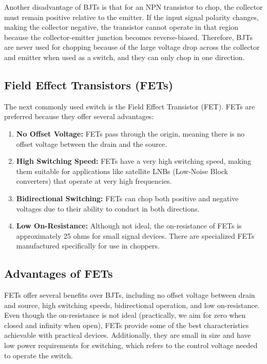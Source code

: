 Another disadvantage of BJTs is that for an NPN transistor to chop, the collector must remain positive relative to the emitter. If the input signal polarity changes, making the collector negative, the transistor cannot operate in that region because the collector-emitter junction becomes reverse-biased. Therefore, BJTs are never used for chopping because of the large voltage drop across the collector and emitter when used as a switch, and they can only chop in one direction.

\subsection{Field Effect Transistors (FETs)}
The next commonly used switch is the Field Effect Transistor (FET). FETs are preferred because they offer several advantages:
\begin{enumerate}
    \item \textbf{No Offset Voltage:} FETs pass through the origin, meaning there is no offset voltage between the drain and the source.
    \item \textbf{High Switching Speed:} FETs have a very high switching speed, making them suitable for applications like satellite LNBs (Low-Noise Block converters) that operate at very high frequencies.
    \item \textbf{Bidirectional Switching:} FETs can chop both positive and negative voltages due to their ability to conduct in both directions.
    \item \textbf{Low On-Resistance:} Although not ideal, the on-resistance of FETs is approximately 25 ohms for small signal devices. There are specialized FETs manufactured specifically for use in choppers.
\end{enumerate}

\subsection{Advantages of FETs}
FETs offer several benefits over BJTs, including no offset voltage between drain and source, high switching speeds, bidirectional operation, and low on-resistance. Even though the on-resistance is not ideal (practically, we aim for zero when closed and infinity when open), FETs provide some of the best characteristics achievable with practical devices. Additionally, they are small in size and have low power requirements for switching, which refers to the control voltage needed to operate the switch.

